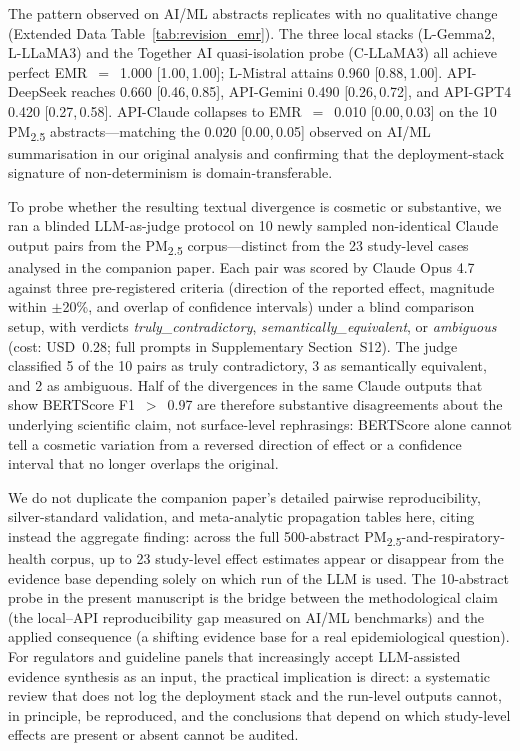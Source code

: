 \documentclass[sn-nature]{sn-jnl}
\begin{document}
The pattern observed on AI/ML abstracts replicates with no qualitative change (Extended Data Table~\ref{tab:revision_emr}).
The three local stacks (L-Gemma2, L-LLaMA3) and the Together AI quasi-isolation probe (C-LLaMA3) all achieve perfect EMR~$=$~1.000 [1.00,\,1.00]; L-Mistral attains 0.960 [0.88,\,1.00].
API-DeepSeek reaches 0.660 [0.46,\,0.85], API-Gemini 0.490 [0.26,\,0.72], and API-GPT4 0.420 [0.27,\,0.58].
API-Claude collapses to EMR~$=$~0.010 [0.00,\,0.03] on the 10 PM\textsubscript{2.5} abstracts---matching the 0.020 [0.00,\,0.05] observed on AI/ML summarisation in our original analysis and confirming that the deployment-stack signature of non-determinism is domain-transferable.

To probe whether the resulting textual divergence is cosmetic or substantive, we ran a blinded LLM-as-judge protocol on 10 newly sampled non-identical Claude output pairs from the PM\textsubscript{2.5} corpus---distinct from the 23 study-level cases analysed in the companion paper.
Each pair was scored by Claude Opus 4.7 against three pre-registered criteria (direction of the reported effect, magnitude within $\pm$20\%, and overlap of confidence intervals) under a blind comparison setup, with verdicts \emph{truly\_contradictory}, \emph{semantically\_equivalent}, or \emph{ambiguous} (cost: USD~0.28; full prompts in Supplementary Section~S12).
The judge classified 5 of the 10 pairs as truly contradictory, 3 as semantically equivalent, and 2 as ambiguous.
Half of the divergences in the same Claude outputs that show BERTScore F1~$>$~0.97 are therefore substantive disagreements about the underlying scientific claim, not surface-level rephrasings: BERTScore alone cannot tell a cosmetic variation from a reversed direction of effect or a confidence interval that no longer overlaps the original.

We do not duplicate the companion paper's detailed pairwise reproducibility, silver-standard validation, and meta-analytic propagation tables here, citing instead the aggregate finding\cite{rover2026evidence}: across the full 500-abstract PM\textsubscript{2.5}-and-respiratory-health corpus, up to 23 study-level effect estimates appear or disappear from the evidence base depending solely on which run of the LLM is used.
The 10-abstract probe in the present manuscript is the bridge between the methodological claim (the local--API reproducibility gap measured on AI/ML benchmarks) and the applied consequence (a shifting evidence base for a real epidemiological question).
For regulators and guideline panels that increasingly accept LLM-assisted evidence synthesis as an input, the practical implication is direct: a systematic review that does not log the deployment stack and the run-level outputs cannot, in principle, be reproduced, and the conclusions that depend on which study-level effects are present or absent cannot be audited.
\end{document}

